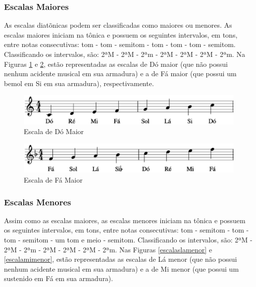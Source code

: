       \subsubsection[Escalas Maiores]{Escalas Maiores}

        As escalas diatõnicas podem ser classificadas como maiores ou menores. As escalas maiores iniciam na tônica e possuem os seguintes intervalos, em tons, entre notas consecutivas: tom - tom - semitom - tom - tom - tom - semitom. Classificando os intervalos, são: 2ªM - 2ªM - 2ªm - 2ªM - 2ªM - 2ªM - 2ªm. Na Figuras \ref{escaladomaior} e \ref{escalafamaior}, estão representadas as escalas de Dó maior (que não possui nenhum acidente musical em sua armadura) e a de Fá maior (que possui um bemol em Si em sua armadura), respectivamente.

        \begin{figure}[htb]
          \centering
          \includegraphics[scale=0.6]{figuras/escaladomaior.eps}
          \caption{Escala de Dó Maior}
          \label{escaladomaior}
        \end{figure}

        \begin{figure}[htb]
          \centering
          \includegraphics[scale=0.6]{figuras/escalafamaior.eps}
          \caption{Escala de Fá Maior}
          \label{escalafamaior}
        \end{figure}

      \subsubsection[Escalas Menores]{Escalas Menores}

        Assim como as escalas maiores, as escalas menores iniciam na tônica e possuem os seguintes intervalos, em tons, entre notas consecutivas: tom - semitom - tom - tom - semitom - um tom e meio - semitom. Classificando os intervalos, são: 2ªM - 2ªM - 2ªm - 2ªM - 2ªM - 2ªM - 2ªm. Nas Figuras \ref{escalaslamenor} e \ref{escalamimenor}, estão representadas as escalas de Lá menor (que não possui nenhum acidente musical em sua armadura) e a de Mi menor (que possui um sustenido em Fá em sua armadura).

